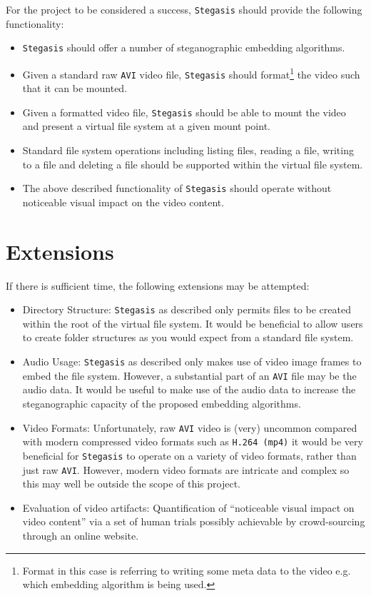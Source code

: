 \documentclass[paper=a4, fontsize=11pt,twoside]{scrartcl}
\numberwithin{table}{section}
\numberwithin{figure}{section}
\numberwithin{algorithm}{section}
\begin{document}
For the project to be considered a success, \texttt{Stegasis} should provide the following functionality:
\begin{itemize}
\item \texttt{Stegasis} should offer a number of steganographic embedding algorithms.
\item Given a standard raw \texttt{AVI} video file, \texttt{Stegasis} should format\footnote{Format in this case is referring to writing some meta data to the video e.g. which embedding algorithm is being used.} the video such that it can be mounted.
\item Given a formatted video file, \texttt{Stegasis} should be able to mount the video and present a virtual file system at a given mount point.
\item Standard file system operations including listing files, reading a file, writing to a file and deleting a file should be supported within the virtual file system.
\item The above described functionality of \texttt{Stegasis} should operate without noticeable visual impact on the video content.
\end{itemize}

\section*{Extensions}

If there is sufficient time, the following extensions may be attempted:
\begin{itemize}
\item Directory Structure: \texttt{Stegasis} as described only permits files to be created within the root of the virtual file system. It would be beneficial to allow users to create folder structures as you would expect from a standard file system.
\item Audio Usage: \texttt{Stegasis} as described only makes use of video image frames to embed the file system. However, a substantial part of an \texttt{AVI} file may be the audio data. It would be useful to make use of the audio data to increase the steganographic capacity of the proposed embedding algorithms.
\item Video Formats: Unfortunately, raw \texttt{AVI} video is (very) uncommon compared with modern compressed video formats such as \texttt{H.264 (mp4)} it would be very beneficial for \texttt{Stegasis} to operate on a variety of video formats, rather than just raw \texttt{AVI}. However, modern video formats are intricate and complex so this may well be outside the scope of this project.
\item Evaluation of video artifacts: Quantification of ``noticeable visual impact on video content'' via a set of human trials possibly achievable by crowd-sourcing through an online website.
\end{itemize}
\end{document}
